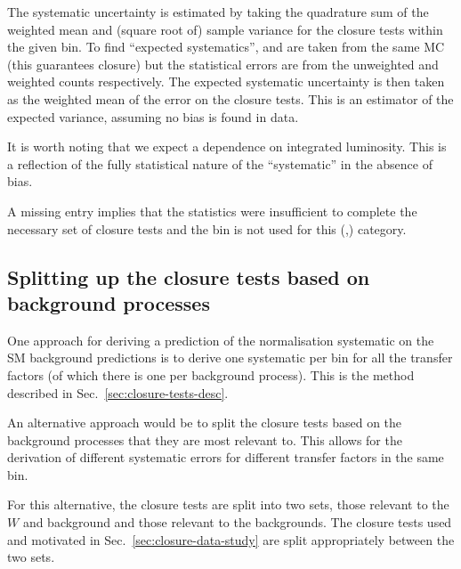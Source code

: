 The systematic uncertainty is estimated by taking the quadrature sum
of the weighted mean and (square root of) sample variance for the
closure tests within the given \scalht bin. To find ``expected
systematics'', \nobs and \npre are taken from the same MC
(this guarantees closure) but the statistical errors are from the
unweighted and weighted counts respectively. The expected systematic
uncertainty is then taken as the weighted mean of the error on the
closure tests. This is an estimator of the expected variance, assuming
no bias is found in data. 

It is worth noting that we expect a dependence on integrated
luminosity. This is a
reflection of the fully statistical nature of the ``systematic'' in
the absence of bias. 

A missing entry implies that the statistics were
insufficient to complete the necessary set of closure tests and the
\scalht bin is not used for this (\njet,\nb) category. 


\subsection{Splitting up the closure tests based on background
processes \label{sec:closure-split}}

One approach for deriving a prediction of the normalisation systematic
on the SM background predictions is to derive one systematic per bin
for all the transfer factors (of which there is one per background process). This is the 
method described in Sec.~\ref{sec:closure-tests-desc}.

An alternative approach would be to split the closure tests based on
the background processes that they are most relevant to. This
allows for the derivation of different systematic errors for different
transfer factors in the same bin.

For this alternative, the closure tests are split into
two sets, those relevant to the $W$ and \ttbar background and those relevant
to the \znunu backgrounds. The closure tests used and motivated in
Sec.~\ref{sec:closure-data-study} are split appropriately between the
two sets. 

